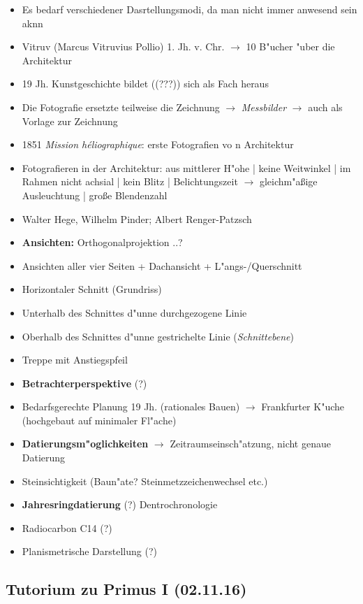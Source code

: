\documentclass[]{scrartcl}
\begin{document}
\begin{itemize}
  \item Es bedarf verschiedener Dasrtellungsmodi, da man nicht immer anwesend sein aknn
  \item Vitruv (Marcus Vitruvius Pollio) 1. Jh. v. Chr. $\rightarrow$ 10 B"ucher "uber die Architektur
  \item 19 Jh. Kunstgeschichte bildet ({\color{red}(???)}) sich als Fach heraus
  \item Die Fotografie ersetzte teilweise die Zeichnung $\rightarrow$ \emph{Messbilder} $\rightarrow$ auch als Vorlage zur Zeichnung
  \item 1851 \emph{Mission h\'{e}liographique}: erste Fotografien vo n Architektur
  \item Fotografieren in der Architektur: aus mittlerer H"ohe | keine Weitwinkel | im Rahmen nicht achsial | kein Blitz | Belichtungszeit $\rightarrow$ gleichm"a\ss ige Ausleuchtung | gro\ss e Blendenzahl
  \item Walter Hege, Wilhelm Pinder; Albert Renger-Patzsch
  \item \textbf{Ansichten:} {\color{red}Orthogonalprojektion ..?} 
  \item Ansichten aller vier Seiten + Dachansicht + L"angs-/Querschnitt
  \item Horizontaler Schnitt (Grundriss)
  \item Unterhalb des Schnittes d"unne durchgezogene Linie
  \item Oberhalb des Schnittes d"unne gestrichelte Linie (\emph{Schnittebene})
  \item Treppe mit Anstiegspfeil
  \item \textbf{Betrachterperspektive} {\color{red}(?)} 
  \item Bedarfsgerechte Planung 19 Jh. (rationales Bauen) $\rightarrow$ Frankfurter K"uche (hochgebaut auf minimaler Fl"ache)
  \item \textbf{Datierungsm"oglichkeiten} $\rightarrow$ Zeitraumseinsch"atzung, nicht genaue Datierung
  \item Steinsichtigkeit (Baun"ate? Steinmetzzeichenwechsel etc.) 
  \item \textbf{Jahresringdatierung} {\color{red}(?)} Dentrochronologie
  \item Radiocarbon C14 {\color{red}(?)}
  \item Planismetrische Darstellung {\color{red}(?)}
\end{itemize}


\subsection{Tutorium zu Primus I (02.11.16)}
\end{document}
